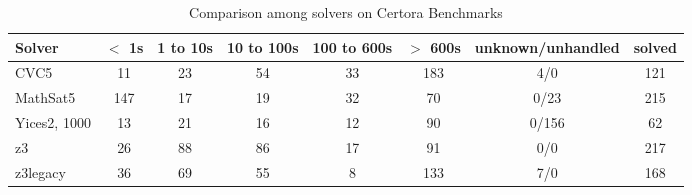 \begin{table}
  \begin{tabular}{|l|c|c|c|c|c|c|c|}
    \hline
    Solver & $<$ 1s & 1 to 10s & 10 to 100s & 100 to 600s & $>$ 600s & unknown/unhandled & solved \\
    \hline
    CVC5 & 11 & 23 & 54 & 33 & 183 & 4/0 & 121 \\
    \hline
    MathSat5 & 147 & 17 & 19 & 32 & 70 & 0/23 & 215 \\
    \hline
    Yices2, 1000 & 13 & 21 & 16 & 12 & 90 & 0/156 & 62 \\
    \hline
    z3 & 26 & 88 & 86 & 17 & 91 & 0/0 & 217 \\
    \hline
    z3legacy & 36 & 69 & 55 & 8 & 133 & 7/0 & 168 \\
    \hline
    \end{tabular}
  \caption{Comparison among solvers on Certora Benchmarks \label{tab:compare-benchmark-submission}}
\end{table}


